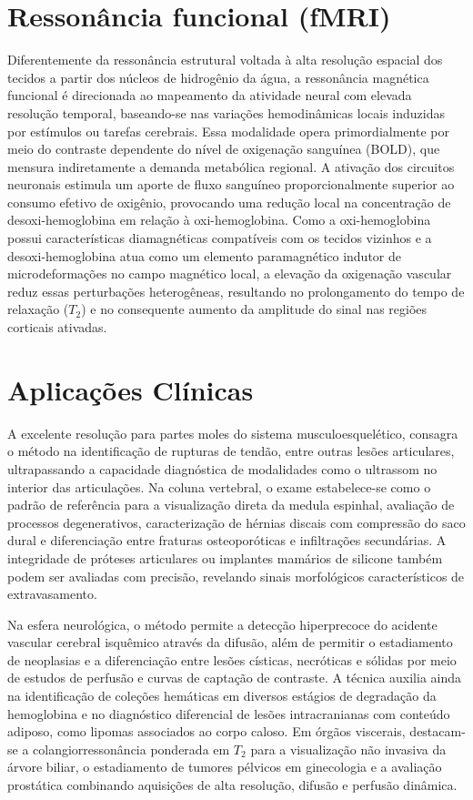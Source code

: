 \documentclass[a4paper,12pt,oneside,openright]{abntex2}
\begin{document}
\section{Ressonância funcional (fMRI)}

Diferentemente da ressonância estrutural voltada à alta resolução espacial dos tecidos a partir dos núcleos de hidrogênio da água, a ressonância magnética funcional é direcionada ao mapeamento da atividade neural com elevada resolução temporal, baseando-se nas variações hemodinâmicas locais induzidas por estímulos ou tarefas cerebrais. Essa modalidade opera primordialmente por meio do contraste dependente do nível de oxigenação sanguínea (BOLD), que mensura indiretamente a demanda metabólica regional. A ativação dos circuitos neuronais estimula um aporte de fluxo sanguíneo proporcionalmente superior ao consumo efetivo de oxigênio, provocando uma redução local na concentração de desoxi-hemoglobina em relação à oxi-hemoglobina. Como a oxi-hemoglobina possui características diamagnéticas compatíveis com os tecidos vizinhos e a desoxi-hemoglobina atua como um elemento paramagnético indutor de microdeformações no campo magnético local, a elevação da oxigenação vascular reduz essas perturbações heterogêneas, resultando no prolongamento do tempo de relaxação ($T_2$) e no consequente aumento da amplitude do sinal nas regiões corticais ativadas.

\section{Aplicações Clínicas}

A excelente resolução para partes moles do sistema musculoesquelético, consagra o método na identificação de rupturas de tendão, entre outras lesões articulares, ultrapassando a capacidade diagnóstica de modalidades como o ultrassom no interior das articulações. Na coluna vertebral, o exame estabelece-se como o padrão de referência para a visualização direta da medula espinhal, avaliação de processos degenerativos, caracterização de hérnias discais com compressão do saco dural e diferenciação entre fraturas osteoporóticas e infiltrações secundárias. A integridade de próteses articulares ou implantes mamários de silicone também podem ser avaliadas com precisão, revelando sinais morfológicos característicos de extravasamento.

Na esfera neurológica, o método permite a detecção hiperprecoce do acidente vascular cerebral isquêmico através da difusão, além de permitir o estadiamento de neoplasias e a diferenciação entre lesões císticas, necróticas e sólidas por meio de estudos de perfusão e curvas de captação de contraste. A técnica auxilia ainda na identificação de coleções hemáticas em diversos estágios de degradação da hemoglobina e no diagnóstico diferencial de lesões intracranianas com conteúdo adiposo, como lipomas associados ao corpo caloso. Em órgãos viscerais, destacam-se a colangiorressonância ponderada em $T_2$ para a visualização não invasiva da árvore biliar, o estadiamento de tumores pélvicos em ginecologia e a avaliação prostática combinando aquisições de alta resolução, difusão e perfusão dinâmica.
\end{document}
